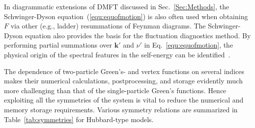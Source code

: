 \documentclass[rmp,aps,reprint,amsmath,amssymb,superscriptaddress,showpacs,nofootinbib]{revtex4-1}
\begin{document}
In diagrammatic extensions of DMFT discussed in Sec.~\ref{Sec:Methods}, the Schwinger-Dyson  equation~(\ref{equ:equofmotion}) is also often used when obtaining $F$  via other (e.g., ladder) resummations of Feynman diagrams. The Schwinger-Dyson equation also provides the basis for the fluctuation diagnostics method. By performing partial summations over $\mathbf{k'}$ and $\nu'$ in Eq.~\eqref{equ:equofmotion}, the physical origin of the spectral features in the self-energy can be identified~\cite{Gunnarsson2015}.

The dependence of two-particle Green's- and vertex functions on several indices makes their numerical calculations, postprocessing, and storage evidently much more challenging than that of the single-particle  Green's functions. Hence exploiting all the symmetries of the system is vital to reduce the numerical and memory storage requirements. Various symmetry relations are summarized in Table~\ref{tab:symmetries} for Hubbard-type models.
\end{document}
